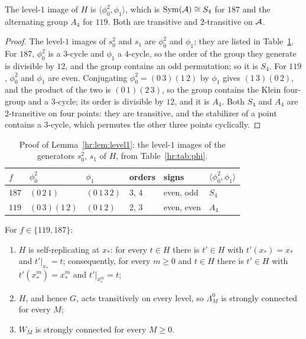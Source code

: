 \begin{lemma}\label{hr:lem:level1}
The level-$1$ image of $H$ is $\langle\phi_0^2,\phi_1\rangle$, which is $\operatorname{Sym}(\mathcal{A})\cong S_4$ for $187$ and the alternating group $A_4$ for $119$. Both are transitive and $2$-transitive on $\mathcal{A}$.
\end{lemma}

\begin{proof}
The level-$1$ images of $s_0^2$ and $s_1$ are $\phi_0^2$ and $\phi_1$; they are listed in Table~\ref{hr:tab:level1}. For $187$, $\phi_0^2$ is a $3$-cycle and $\phi_1$ a $4$-cycle, so the order of the group they generate is divisible by $12$, and the group contains an odd permutation; so it is $S_4$. For $119$, $\phi_0^2$ and $\phi_1$ are even. Conjugating $\phi_0^2=(0\,3)(1\,2)$ by $\phi_1$ gives $(1\,3)(0\,2)$, and the product of the two is $(0\,1)(2\,3)$, so the group contains the Klein four-group and a $3$-cycle; its order is divisible by $12$, and it is $A_4$. Both $S_4$ and $A_4$ are $2$-transitive on four points: they are transitive, and the stabilizer of a point contains a $3$-cycle, which permutes the other three points cyclically.
\end{proof}

\begin{table}[ht]
\centering
\begin{tabular}{llllll}
\toprule
$f$ & $\phi_0^2$ & $\phi_1$ & orders & signs & $\langle\phi_0^2,\phi_1\rangle$\\
\midrule
$187$ & $(0\,2\,1)$ & $(0\,1\,3\,2)$ & $3$, $4$ & even, odd & $S_4$\\
$119$ & $(0\,3)(1\,2)$ & $(0\,1\,2)$ & $2$, $3$ & even, even & $A_4$\\
\bottomrule
\end{tabular}
\caption{Proof of Lemma~\ref{hr:lem:level1}: the level-$1$ images of the generators $s_0^2$, $s_1$ of $H$, from Table~\ref{hr:tab:phi}.}
\label{hr:tab:level1}
\end{table}

\begin{proposition}\label{hr:prop:tree}
For $f\in\{119,187\}$:
\begin{enumerate}
\item $H$ is self-replicating at $x_*$: for every $t\in H$ there is $t'\in H$ with $t'(x_*)=x_*$ and $t'|_{x_*}=t$; consequently, for every $m\ge0$ and $t\in H$ there is $t'\in H$ with $t'(x_*^m)=x_*^m$ and $t'|_{x_*^m}=t$;
\item $H$, and hence $G$, acts transitively on every level, so $\Lambda^0_M$ is strongly connected for every $M$;
\item $W_M$ is strongly connected for every $M\ge0$.
\end{enumerate}
\end{proposition}

